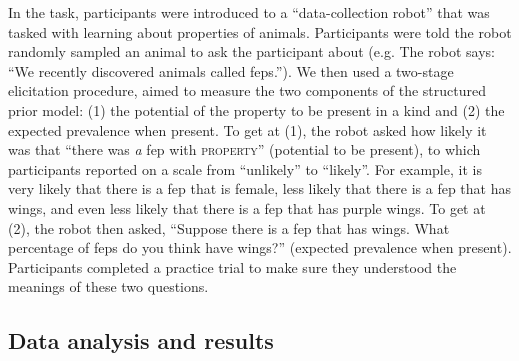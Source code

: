\documentclass[12pt,letterpaper]{article}
\begin{document}
In the task, participants were introduced to a ``data-collection robot'' that was tasked with learning about properties of animals. 
Participants were told the robot randomly sampled an animal to ask the participant about (e.g. The robot says: ``We recently discovered animals called feps.''). 
We then used a two-stage elicitation procedure, aimed to measure the two components of the structured prior model: (1) the potential of the property to be present in a kind and (2) the expected prevalence when present.
To get at (1), the robot asked how likely it was that ``there was \emph{a} fep with \textsc{property}'' (potential to be present), to which participants reported on a scale from ``unlikely'' to ``likely''.
For example, it is very likely that there is a fep that is female, less likely that there is a fep that has wings, and even less likely that there is a fep that has purple wings. 
To get at (2), the robot then asked, ``Suppose there is a fep that has wings. What percentage of feps do you think have wings?'' (expected prevalence when present). 
Participants completed a practice trial to make sure they understood the meanings of these two questions.

%

\subsection*{Data analysis and results}
\end{document}
